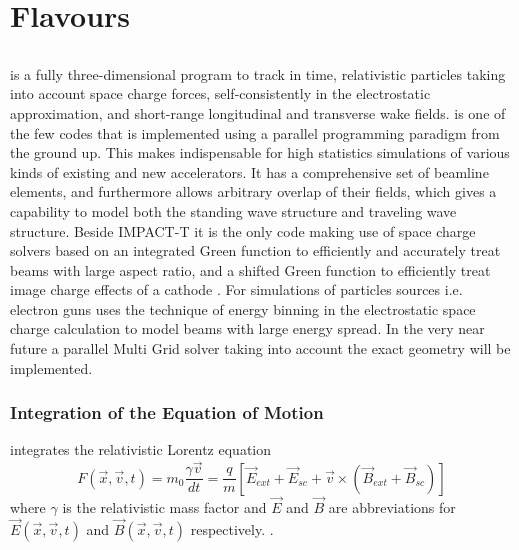%
%




\chapter{\opal Flavours}
\label{chp:opalFlavours}

\section{\opalt}
\opalt is a fully three-dimensional program to track in time, relativistic particles taking into account space charge forces, self-consistently in the electrostatic approximation, and short-range longitudinal and transverse wake fields. \opalt is one of the few
codes  that is implemented using a parallel programming paradigm from the ground up. This makes \opalt indispensable for
high statistics simulations of various kinds of existing and new accelerators. It has a comprehensive set of beamline
elements, and furthermore allows arbitrary overlap of their fields, which gives \opalt a capability
to model both the standing wave structure and traveling wave structure. Beside IMPACT-T it is the only code making use of
space charge solvers based on an integrated Green \cite{qiang2005, qiang2006-1,qiang2006-2} function to efficiently and accurately treat beams with
large aspect ratio, and a shifted Green function to efficiently treat image charge effects of a cathode \cite{fubiani2006,qiang2006-1,qiang2006-2}.
For simulations of particles sources i.e. electron guns \opalt uses the technique of  energy binning in the electrostatic space charge calculation to model beams with large
energy spread. In the very near future a parallel Multi Grid solver taking into account the exact geometry will be implemented.

\subsection{Integration of the Equation of Motion}
\opalt integrates the relativistic Lorentz equation
\begin{equation}
F(\vec{x},\vec{v},t) = m_0 \frac{\gamma \vec{v}}{dt} =   \frac{q}{m}[\vec{E}_{ext} + \vec{E}_{sc} + \vec{v} \times (\vec{B}_{ext} + \vec{B}_{sc})]
\end{equation}
where $\gamma$ is the relativistic mass factor and $\vec{E}$  and $\vec{B}$ are abbreviations for $\vec{E}(\vec{x},\vec{v},t)$ and $\vec{B}(\vec{x},\vec{v},t)$
respectively. \latermore .

